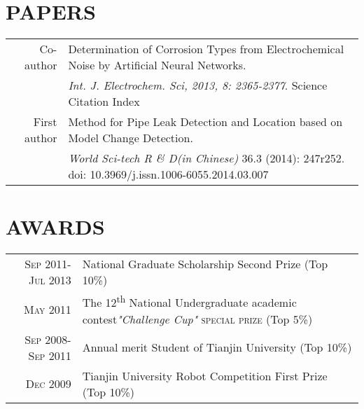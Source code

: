 \documentclass[letterpaper,11pt]{article} %
\begin{document}
\section{PAPERS}
\begin{tabular}{rl}
Co-author & Determination of Corrosion Types from Electrochemical Noise by Artificial Neural Networks. \\

&\emph{Int. J. Electrochem. Sci, 2013, 8: 2365-2377}.   {\hfill \small{Science Citation Index}}\\
First author &  Method for Pipe Leak Detection and Location based on Model Change Detection. \\
&\emph{World Sci-tech R \& D(in Chinese)} 36.3 (2014): 247r252. {\hfill \small{doi: 10.3969/j.issn.1006-6055.2014.03.007}}\\
\end{tabular}




\section{AWARDS}

\begin{tabular}{rl}
\textsc{Sep 2011- Jul 2013} & National Graduate Scholarship Second Prize \small(Top 10\%)\normalsize\\
\textsc{May 2011} & The 12\textsuperscript{th} National Undergraduate academic contest\emph{"Challenge Cup"} \textsc{special prize} \small(Top 5\%)\\ %
\textsc{Sep 2008-Sep 2011} & Annual merit Student of Tianjin University \small(Top 10\%) \\
\textsc{Dec 2009} & Tianjin University Robot Competition First Prize \small(Top 10\%)\normalsize\\
\end{tabular}
\end{document}
